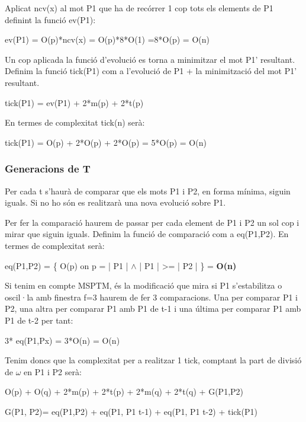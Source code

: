 \documentclass[12pt,a4paper]{report}
\def \w{$\omega$}
\begin{document}
Aplicat ncv(x) al mot P1 que ha de recórrer 1 cop tots els elements de P1 definint la funció ev(P1):

\begin{center}
ev(P1) = O(p)*ncv(x) = O(p)*8*O(1) =8*O(p) = O(n)
\end{center}

Un cop aplicada la funció d’evolució es torna a minimitzar el mot P1’ resultant. Definim la funció tick(P1) com a l'evolució de P1 + la minimització del mot P1' resultant.

\begin{center}
tick(P1) = ev(P1) + 2*m(p) + 2*t(p)
\end{center}

En termes de complexitat tick(n) serà:

\begin{center}
tick(P1) = O(p) + 2*O(p) + 2*O(p) = 5*O(p) = O(n)
\end{center}

\subsubsection{Generacions de T}

Per cada t s'haurà de comparar que els mots P1 i P2, en forma mínima, siguin iguals. Si no ho són es realitzarà una nova evolució sobre P1.

Per fer la comparació haurem de passar per cada element de P1 i P2 un sol cop i mirar que siguin iguals. Definim la funció de comparació com a eq(P1,P2). En termes de complexitat serà:

\begin{center}
eq(P1,P2) = \{ O(p) on p = | P1 | $\wedge$ | P1 | >= | P2 | \} = \textbf{O(n)}
\end{center}

Si tenim en compte MSPTM, és la modificació que mira si P1 s’estabilitza o oscil·la amb finestra f=3 haurem de fer 3 comparacions. Una per comparar P1 i P2, una altra per comparar P1 amb P1 de t-1 i una última per comparar P1 amb P1 de t-2 per tant:

\begin{center}
3* eq(P1,Px) = 3*O(n) = O(n)
\end{center}

Tenim doncs que la complexitat per a realitzar 1 tick, comptant la part de divisió de \w{} en P1 i P2 serà:

\begin{center}
O(p) + O(q) + 2*m(p) + 2*t(p) + 2*m(q) + 2*t(q) + G(P1,P2)

G(P1, P2)=  eq(P1,P2) + eq(P1, P1 t-1) + eq(P1, P1 t-2) + tick(P1)
\end{center}
\end{document}
